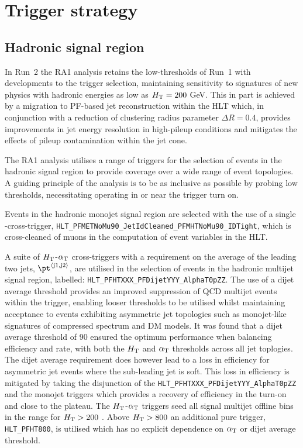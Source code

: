 \section{Trigger strategy}
\label{sec:triggers}


\subsection{Hadronic signal region\label{sec:hadronic_signal_region}}

In Run~2 the RA1 analysis retains the low-thresholds of Run~1 with developments 
to the trigger selection, maintaining sensitivity to signatures of new physics with hadronic 
energies as low as $\mbox{$H_\text{T}$} = 200$ GeV. This in part is achieved by a migration to PF-based 
jet reconstruction within the HLT which, in conjunction with a reduction of clustering radius 
parameter $\Delta R = 0.4$, provides improvements in jet energy resolution in high-pileup 
conditions and mitigates the effects of pileup contamination within the jet cone.

The RA1 analysis utilises a range of triggers for the selection of events in the hadronic signal region
to provide coverage over a wide range of event topologies. A guiding principle of the analysis is to be as
inclusive as possible by probing low thresholds, necessitating operating in or near the trigger turn on.

Events in the hadronic monojet signal region are selected with the use of a single \mht-\met cross-trigger, 
\verb!HLT_PFMETNoMu90_JetIdCleaned_PFMHTNoMu90_IDTight!, which is cross-cleaned of muons in the computation 
of event variables in the HLT. 

A suite of $\mbox{$H_\text{T}$}$-$\alpha_{\text{T}}$ cross-triggers 
with a requirement on the average \pt of the leading two jets, $\pt^{\rm \left<j1,j2\right>}$, 
are utilised in the selection of events in the hadronic multijet signal region, labelled: 
\verb!HLT_PFHTXXX_PFDijetYYY_AlphaT0pZZ!. The use of a dijet average threshold provides an improved 
suppression of QCD multijet events within the trigger,
enabling looser \alphat thresholds to be utilised whilst maintaining acceptance to events exhibiting asymmetric jet 
topologies such as monojet-like signatures of compressed spectrum and DM models. It was found that a dijet average
threshold of 90 \GeV ensured the optimum performance when balancing efficiency and rate, with both the $\mbox{$H_\text{T}$}$ and $\alpha_{\text{T}}$
thresholds across all jet toplogies. The dijet average requirement does however lead to a loss in efficiency for 
asymmetric jet events where the sub-leading jet is soft. This loss in efficiency is mitigated by taking the 
disjunction of the \verb!HLT_PFHTXXX_PFDijetYYY_AlphaT0pZZ! and the monojet triggers which provides a recovery 
of efficiency in the turn-on and close to the plateau. The $\mbox{$H_\text{T}$}$-$\alpha_{\text{T}}$ triggers seed all signal multijet offline 
bins in the range for $\mbox{$H_\text{T}$} > 200$ \GeV. Above $\mbox{$H_\text{T}$} > 800$ an additional pure \scalht trigger, \verb!HLT_PFHT800!, 
is utilised which has no explicit dependence on $\alpha_{\text{T}}$ or dijet average threshold. 

